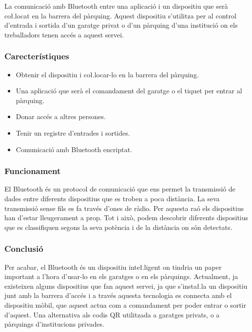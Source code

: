 La comunicació amb Bluetooth entre una aplicació
i un dispositiu que serà co\l.locat en la barrera del pàrquing. Aquest dispositiu s'utilitza
per al control d'entrada i sortida d'un garatge privat o d'un
pàrquing d'una institució on els treballadors tenen accés a aquest servei.

\subsubsection{Carecterístiques}
\label{sssec:alternatives}

\begin{itemize}
    \item Obtenir el dispositiu i co\l.locar-lo en la barrera del pàrquing.
    \item Una aplicació que serà el comandament del garatge o el tiquet per entrar al pàrquing.
    \item Donar accés a altres persones.
    \item Tenir un registre d'entrades i sortides.
    \item Comunicació amb Bluetooth encriptat.
\end{itemize}

\subsubsection{Funcionament}

El Bluetooth és un protocol de comunicació que ens permet la transmissió
de dades entre diferents dispositius que es troben a poca distància. La seva transmissió
sense fils es fa través d'ones de ràdio. Per aquesta raó els dispositius han d'estar
lleugerament a prop. Tot i això, podem descobrir diferents dispositius que es classifiquen
segons la seva potència i de la distància on són detectats.


\subsubsection{Conclusió}

Per acabar, el Bluetooth és un dispositiu inte\l.ligent on tindria un paper important
a l'hora d'usar-lo en els garatges o en els pàrquings. Actualment, ja existeixen alguns dispositius
que fan aquest servei, ja que s'insta\l.la un dispositiu junt amb la barrera d'accés i a través aquesta
tecnologia es connecta amb el dispositiu mòbil, que aquest actua com a comandament per poder entrar o sortir
d'aquest. Una alternativa als codis QR utilitzada a garatges privats, o a pàrquings d'institucions privades.